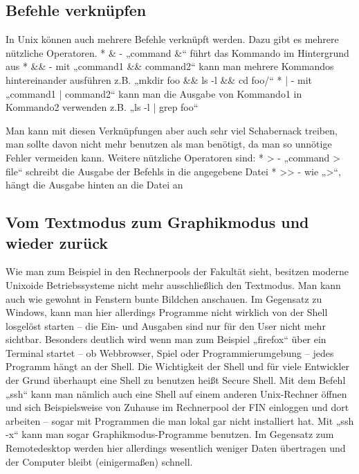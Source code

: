\subsection{Befehle verknüpfen}
In Unix können auch mehrere Befehle verknüpft werden. Dazu gibt es mehrere nützliche Operatoren.
* \& - „command \&“ führt das Kommando im Hintergrund aus
* \&\& - mit „command1 \&\& command2“ kann man mehrere Kommandos hintereinander ausführen z.B. „mkdir foo \&\& ls -l \&\& cd foo/“
* | - mit „command1 | command2“ kann man die Ausgabe von Kommando1 in Kommando2 verwenden  z.B. „ls -l | grep foo“

Man kann mit diesen Verknüpfungen aber auch sehr viel Schabernack treiben, man sollte davon nicht mehr benutzen als man benötigt, da man so unnötige Fehler vermeiden kann.
Weitere nützliche Operatoren sind:
* > - „command > file“ schreibt die Ausgabe der Befehls in die angegebene Datei
* >> - wie „>“, hängt die Ausgabe hinten an die Datei an

\subsection{Vom Textmodus zum Graphikmodus und wieder zurück}
Wie man zum Beispiel in den Rechnerpools der Fakultät sieht, besitzen moderne Unixoide Betriebssysteme nicht mehr ausschließlich den Textmodus. Man kann auch wie gewohnt in Fenstern bunte Bildchen anschauen.
Im Gegensatz zu Windows, kann man hier allerdings Programme nicht wirklich von der Shell losgelöst starten – die Ein- und Ausgaben sind nur für den User nicht mehr sichtbar. Besonders deutlich wird wenn man zum Beispiel „firefox“ über ein Terminal startet – ob Webbrowser, Spiel oder Programmierumgebung – jedes Programm hängt an der Shell.
Die Wichtigkeit der Shell und für viele Entwickler der Grund überhaupt eine Shell zu benutzen heißt Secure Shell. Mit dem Befehl „ssh“ kann man nämlich auch eine Shell auf einem anderen Unix-Rechner öffnen und sich Beispielsweise von Zuhause im Rechnerpool der FIN einloggen und dort arbeiten – sogar mit Programmen die man lokal gar nicht installiert hat. Mit „ssh -x“ kann man sogar Graphikmodus-Programme benutzen.
Im Gegensatz zum Remotedesktop werden hier allerdings wesentlich weniger Daten übertragen und der Computer bleibt (einigermaßen) schnell.
